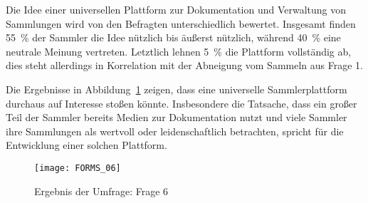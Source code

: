 Die Idee einer universellen Plattform zur Dokumentation und Verwaltung von Sammlungen wird von den Befragten unterschiedlich bewertet.
Insgesamt finden 55~\% der Sammler die Idee nützlich bis äußerst nützlich, während 40~\% eine neutrale Meinung vertreten.
Letztlich lehnen 5~\% die Plattform vollständig ab, dies steht allerdings in Korrelation mit der Abneigung vom Sammeln aus Frage 1.

Die Ergebnisse in Abbildung~\ref{fig:forms_result_06} zeigen, dass eine universelle Sammlerplattform durchaus auf Interesse stoßen könnte.
Insbesondere die Tatsache, dass ein großer Teil der Sammler bereits Medien zur Dokumentation nutzt und viele Sammler ihre Sammlungen als wertvoll oder leidenschaftlich betrachten, spricht für die Entwicklung einer solchen Plattform.

\begin{figure}[h!]
    \centering
    \texttt{[image: FORMS\_06]}
    \caption{Ergebnis der Umfrage: Frage 6}
    \label{fig:forms_result_06}
\end{figure}

